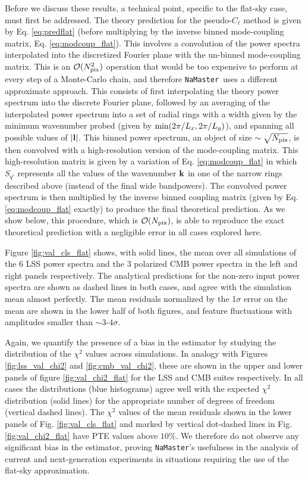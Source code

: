 \documentclass[usenatbib]{mnrasb}
\newcommand{\nmt}{{\tt NaMaster}}
\begin{document}
      Before we discuss these results, a technical point, specific to the flat-sky case, must first be addressed. The theory prediction for the pseudo-$C_\ell$ method is given by Eq. \ref{eq:predflat} (before multiplying by the inverse binned mode-coupling matrix, Eq. \ref{eq:modcoup_flat}). This involves a convolution of the power spectra interpolated into the discretized Fourier plane with the un-binned mode-coupling matrix. This is an $\mathcal{O}(N_{\rm pix}^2)$ operation that would be too expensive to perform at every step of a Monte-Carlo chain, and therefore \nmt~uses a different approximate approach. This consists of first interpolating the theory power spectrum into the discrete Fourier plane, followed by an averaging of the interpolated power spectrum into a set of radial rings with a width given by the minimum wavenumber probed (given by ${\rm min}(2\pi/L_x,2\pi/L_y)$), and spanning all possible values of $|{\bf l}|$. This binned power spectrum, an object of size $\sim\sqrt{N_{\rm pix}}$, is then convolved with a high-resolution version of the mode-coupling matrix. This high-resolution matrix is given by a variation of Eq. \ref{eq:modcoup_flat} in which $S_{q'}$ represents all the values of the wavenumber ${\bf k}$ in one of the narrow rings described above (instead of the final wide bandpowers). The convolved power spectrum is then multiplied by the inverse binned coupling matrix (given by Eq. \ref{eq:modcoup_flat} exactly) to produce the final theoretical prediction. As we show below, this procedure, which is $\mathcal{O}(N_{\rm pix})$, is able to reproduce the exact theoretical prediction with a negligible error in all cases explored here.
      
      Figure \ref{fig:val_cls_flat} shows, with solid lines, the mean over all simulations of the 6 LSS power spectra and the 3 polarized CMB power spectra in the left and right panels respectively. The analytical predictions for the non-zero input power spectra are shown as dashed lines in both cases, and agree with the simulation mean almost perfectly. The mean residuals normalized by the 1$\sigma$ error on the mean are shown in the lower half of both figures, and feature fluctuations with amplitudes smaller than $\sim3$-$4\sigma$.
      
      Again, we quantify the presence of a bias in the estimator by studying the distribution of the $\chi^2$ values across simulations. In analogy with Figures \ref{fig:lss_val_chi2} and \ref{fig:cmb_val_chi2}, these are shown in the upper and lower panels of figure \ref{fig:val_chi2_flat} for the LSS and CMB suites respectively. In all cases the distributions (blue histograms) agree well with the expected $\chi^2$ distribution (solid lines) for the appropriate number of degrees of freedom (vertical dashed lines). The $\chi^2$ values of the mean residuals shown in the lower panels of Fig. \ref{fig:val_cls_flat} and marked by vertical dot-dashed lines in Fig. \ref{fig:val_chi2_flat} have PTE values above $10\%$. We therefore do not observe any significant bias in the estimator, proving \nmt's usefulness in the analysis of current and next-generation experiments in situations requiring the use of the flat-sky approximation.
 
\end{document}
